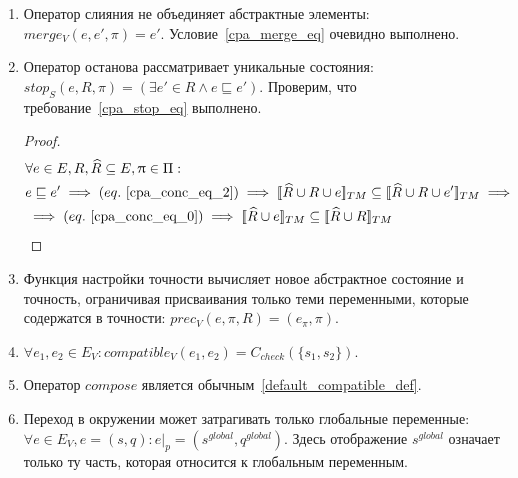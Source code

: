 \begin{enumerate}
\item Оператор слияния не объединяет абстрактные элементы: $merge_V(e, e', \pi) = e'$. Условие~\ref{cpa_merge_eq} очевидно выполнено.

\item Оператор останова рассматривает уникальные состояния: $stop_S(e, R, \pi) = (\exists e' \in R \land e \sqsubseteq e')$.
Проверим, что требование~\ref{cpa_stop_eq} выполнено.
\begin{proof}
\begin{align*}
&\forall e \in E, R, \widehat{R} \subseteq E, \pi \in \Pi: \\
& e \sqsubseteq e' \implies (eq.~\ref{cpa_conc_eq_2}) \implies \conctm{\widehat{R} \cup R \cup e} \subseteq \conctm{\widehat{R} \cup R \cup e'} \implies \\
& \implies (eq.~\ref{cpa_conc_eq_0}) \implies \conctm{\widehat{R} \cup e} \subseteq \conctm{\widehat{R} \cup R} 
\end{align*}
\end{proof}

\item Функция настройки точности вычисляет новое абстрактное состояние и точность, ограничивая присваивания только теми переменными, которые содержатся в точности: $prec_V(e, \pi, R) = (e_{\pi}, \pi)$.

\item $\forall e_1, e_2 \in E_V: compatible_V(e_1,e_2) = C_{check}(\{s_1, s_2\})$.

\item Оператор $compose$ является обычным~\ref{default_compatible_def}.

\item Переход в окружении может затрагивать только глобальные переменные: $\forall e \in E_V, e=(s,q):e|_p=(s^{global},q^{global})$.
 Здесь отображение $s^{global}$ означает только ту часть, которая относится к глобальным переменным.
\end{enumerate}


